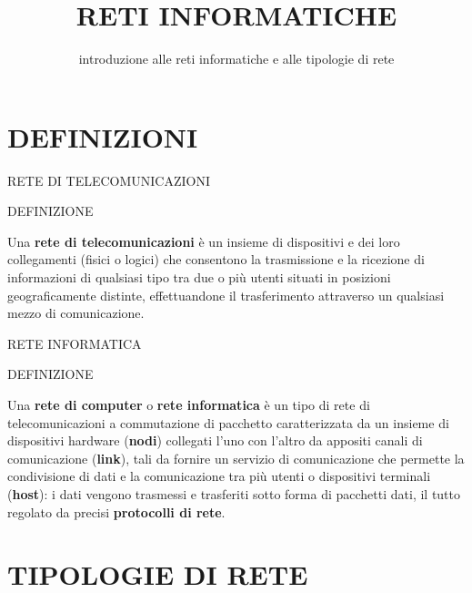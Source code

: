 \documentclass[aspectratio=1610]{beamer}
\title{RETI INFORMATICHE}
\subtitle{introduzione alle reti informatiche e alle tipologie di rete}
\date{}
\institute{\textit{
        Fonti:
        \begin{itemize}
            \item[-] \href{https://it.wikipedia.org/wiki/Rete_di_computer}{Wikipedia}
            \item[-] \href{https://www.cappellieditore.it/testi/skills-box/}{SkillsBox}
        \end{itemize}
    }
}
\begin{document}
\begin{frame}
    \titlepage
\end{frame}

\section{DEFINIZIONI}

\begin{frame}{RETE DI TELECOMUNICAZIONI}
    \begin{alertblock}{DEFINIZIONE}
        \begin{minipage}{0.98\linewidth}
            \justifying
            Una \textbf{rete di telecomunicazioni} è un insieme di dispositivi e dei loro collegamenti (fisici o logici) 
            che consentono la trasmissione e la ricezione di informazioni di qualsiasi tipo tra due o più utenti situati 
            in posizioni geograficamente distinte, effettuandone il trasferimento attraverso un qualsiasi mezzo di comunicazione.
        \end{minipage}
    \end{alertblock}
\end{frame}

\begin{frame}{RETE INFORMATICA}
    \begin{alertblock}{DEFINIZIONE}
        \begin{minipage}{0.98\linewidth}
            \justifying
            Una \textbf{rete di computer} o \textbf{rete informatica} è un tipo di rete di telecomunicazioni a commutazione di pacchetto 
            caratterizzata da un insieme di dispositivi hardware (\textbf{nodi}) collegati l'uno con l'altro da appositi canali 
            di comunicazione (\textbf{link}), tali da fornire un servizio di comunicazione che permette la condivisione di dati e la 
            comunicazione tra più utenti o dispositivi terminali (\textbf{host}): i dati vengono trasmessi e trasferiti sotto forma di pacchetti 
            dati, il tutto regolato da precisi \textbf{protocolli di rete}.
        \end{minipage}
    \end{alertblock}
\end{frame}

\section{TIPOLOGIE DI RETE}
\end{document}
